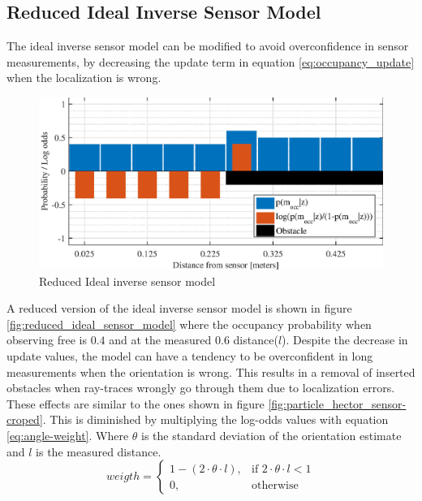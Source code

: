 \subsection{Reduced Ideal Inverse Sensor Model}
\label{sec:reduced_ideal_sensor_model}
The ideal inverse sensor model can be modified to avoid overconfidence in sensor measurements, by decreasing the update term in equation \ref{eq:occupancy_update} when the localization is wrong. 

\begin{figure}[htbp]
	\centering
	\includegraphics[scale=1]{figures/static_mapping/reduced_ideal_sensor_model}
	\caption{Reduced Ideal inverse sensor model}
	\label{fig:reduced_ideal_sensor_model}
\end{figure}

A reduced version of the ideal inverse sensor model is shown in figure \vref{fig:reduced_ideal_sensor_model} where the occupancy probability when observing free is $0.4$ and at the measured $0.6$ distance($l$). 
Despite the decrease in update values, the model can have a tendency to be overconfident in long measurements when the orientation is wrong.
This results in a removal of inserted obstacles when ray-traces wrongly go through them due to localization errors.
These effects are similar to the ones shown in figure \ref{fig:particle_hector_sensor-croped}.
This is diminished by multiplying the log-odds values with equation \vref{eq:angle-weight}.
Where \(\theta \) is the standard deviation of the orientation estimate and \(l\) is the measured distance.
\begin{equation}
\label{eq:angle-weight}
weigth = 
\begin{cases}
1 - ( 2 \cdot \theta \cdot l ), & \text{if } 2 \cdot \theta \cdot l < 1\\
0, & \text{otherwise}
\end{cases}
\end{equation}

